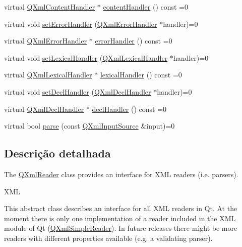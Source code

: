 \begin{DoxyCompactItemize}
\item 
virtual \hyperlink{class_q_xml_content_handler}{Q\-Xml\-Content\-Handler} $\ast$ \hyperlink{class_q_xml_reader_ad574f77f4825e3227eda9e6ba40c800d}{content\-Handler} () const =0
\item 
virtual void \hyperlink{class_q_xml_reader_a4d2cc3731d45b37ac0a8f8248007b4b7}{set\-Error\-Handler} (\hyperlink{class_q_xml_error_handler}{Q\-Xml\-Error\-Handler} $\ast$handler)=0
\item 
virtual \hyperlink{class_q_xml_error_handler}{Q\-Xml\-Error\-Handler} $\ast$ \hyperlink{class_q_xml_reader_ab7c18a58b91aedc05837f4d9598dfbb5}{error\-Handler} () const =0
\item 
virtual void \hyperlink{class_q_xml_reader_a5d8760a6bd5b439c78a1c2d925e0ba7f}{set\-Lexical\-Handler} (\hyperlink{class_q_xml_lexical_handler}{Q\-Xml\-Lexical\-Handler} $\ast$handler)=0
\item 
virtual \hyperlink{class_q_xml_lexical_handler}{Q\-Xml\-Lexical\-Handler} $\ast$ \hyperlink{class_q_xml_reader_a81ee75f7e3db2f6ce9fd6a5707ff20ee}{lexical\-Handler} () const =0
\item 
virtual void \hyperlink{class_q_xml_reader_a00252501a616d2e14f5d51acc2cb1165}{set\-Decl\-Handler} (\hyperlink{class_q_xml_decl_handler}{Q\-Xml\-Decl\-Handler} $\ast$handler)=0
\item 
virtual \hyperlink{class_q_xml_decl_handler}{Q\-Xml\-Decl\-Handler} $\ast$ \hyperlink{class_q_xml_reader_ac9534503343e6777362094d8fe68a298}{decl\-Handler} () const =0
\item 
virtual bool \hyperlink{class_q_xml_reader_a957bf018eb96669556913282ac0e4406}{parse} (const \hyperlink{class_q_xml_input_source}{Q\-Xml\-Input\-Source} \&input)=0
\end{DoxyCompactItemize}


\subsection{Descrição detalhada}
The \hyperlink{class_q_xml_reader}{Q\-Xml\-Reader} class provides an interface for X\-M\-L readers (i.\-e. parsers). 

X\-M\-L

This abstract class describes an interface for all X\-M\-L readers in Qt. At the moment there is only one implementation of a reader included in the X\-M\-L module of Qt (\hyperlink{class_q_xml_simple_reader}{Q\-Xml\-Simple\-Reader}). In future releases there might be more readers with different properties available (e.\-g. a validating parser).

